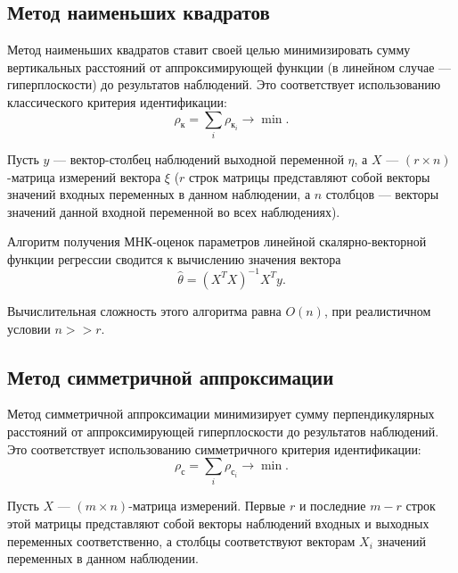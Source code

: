 \subsection{Метод наименьших квадратов}

Метод наименьших квадратов ставит своей целью минимизировать сумму вертикальных расстояний
от аппроксимирующей функции (в линейном случае --- гиперплоскости) до результатов наблюдений.
Это соответствует использованию классического критерия идентификации:
\begin{equation*}
  \rho_{\text{к}} = \sum_i \rho_{\text{к}_i} \rightarrow \min.
\end{equation*}

Пусть \( y \) --- вектор-столбец наблюдений выходной переменной \( \eta \),
а \( X \) --- \( (r \times n) \)-матрица измерений вектора \( \xi \)
(\( r \) строк матрицы представляют собой векторы значений входных переменных в данном наблюдении,
а \( n \) столбцов --- векторы значений данной входной переменной во всех наблюдениях).

Алгоритм получения МНК-оценок параметров линейной скалярно-векторной функции регрессии сводится
к вычислению значения вектора~\cite{wiki_lse}
\begin{equation*}
  \hat{\theta} = (X^{T}X)^{-1}X^{T} y.
\end{equation*}

Вычислительная сложность этого алгоритма равна \( O(n) \),
при реалистичном условии \( n >> r \).

\vspace{2\baselineskip}
\subsection{Метод симметричной аппроксимации}

Метод симметричной аппроксимации минимизирует сумму перпендикулярных расстояний
от аппроксимирующей гиперплоскости до результатов наблюдений.
Это соответствует использованию симметричного критерия идентификации:
\begin{equation*}
  \rho_{\text{с}} = \sum_i \rho_{\text{с}_i} \rightarrow \min.
\end{equation*}

Пусть \( X \) --- \( (m \times n) \)-матрица измерений.
Первые \( r \) и последние \( m - r \) строк этой матрицы представляют собой векторы наблюдений
входных и выходных переменных соответственно,
а столбцы соответствуют векторам \( X_i \) значений переменных в данном наблюдении.

